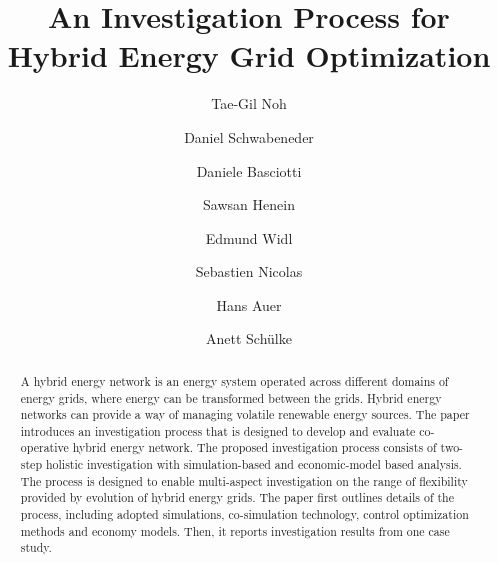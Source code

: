 \documentclass[review]{elsarticle}
\begin{document}
\newcommand{\todo}[1]{\textbf{TODO: #1}\\}

\begin{frontmatter}

\title{An Investigation Process for Hybrid Energy Grid Optimization}




\author[NLE]{Tae-Gil Noh}

\author[TUWien]{Daniel Schwabeneder}

\author[AIT]{Daniele Basciotti}

\author[AIT]{Sawsan Henein}

\author[AIT]{Edmund Widl}

\author[NLE]{Sebastien Nicolas}

\author[TUWien]{Hans Auer}

\author[NLE]{Anett Sch\"ulke}

\address[NLE]{NEC Laboratories Europe, Kurfuersten-Anlage 36, 69115,
  Heidelberg, Germany}
\address[TUWien]{(address of EEG), TU Wien, Vienna, Austria}
\address[AIT]{(address of AIT), Vienna, Austria} 


\begin{abstract}
A hybrid energy network is an energy system operated across different
domains of energy grids, where energy can be transformed between the
grids. Hybrid energy networks can provide a way of managing volatile 
renewable energy sources. The paper introduces an investigation
process that is designed to develop and evaluate co-operative hybrid
energy network. The proposed investigation process consists of
two-step holistic investigation with simulation-based and
economic-model based analysis. The process is designed to enable
multi-aspect investigation on the range of flexibility provided by
evolution of hybrid energy grids. The paper first outlines details of
the process, including adopted simulations, co-simulation technology,
control optimization methods and economy models. Then, it reports
investigation results from one case study. 
\end{abstract}


\end{frontmatter}
\end{document}
